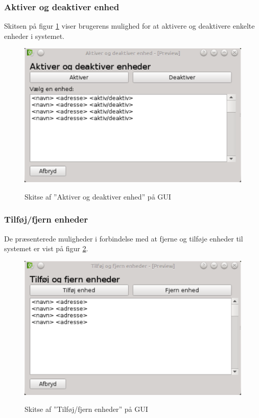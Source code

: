 \subsubsection{Aktiver og deaktiver enhed}
Skitsen på figur \ref{fig:GUI-aktiver-deaktiver} viser brugerens mulighed for at aktivere og deaktivere enkelte enheder i systemet.

\begin{figure}[htbp] \centering
{\includegraphics[scale=0.5]{filer/pics/GUI/Aktiver-deaktiver-enheder}}
\caption{Skitse af ''Aktiver og deaktiver enhed'' på GUI}
\label{fig:GUI-aktiver-deaktiver}
\end{figure}

\subsubsection{Tilføj/fjern enheder}
De præsenterede muligheder i forbindelse med at fjerne og tilføje enheder til systemet er vist på figur \ref{fig:GUI-tilfoj-fjern}.

\begin{figure}[htbp] \centering
{\includegraphics[scale=0.5]{filer/pics/GUI/Tilfoj-fjern-enheder}}
\caption{Skitse af ''Tilføj/fjern enheder'' på GUI}
\label{fig:GUI-tilfoj-fjern}
\end{figure}

